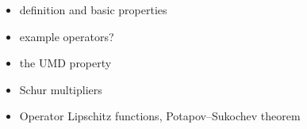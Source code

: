 \begin{itemize}
\item definition and basic properties
\item example operators?
\item the UMD property
\item Schur multipliers
\item Operator Lipschitz functions, Potapov--Sukochev theorem
\end{itemize}

